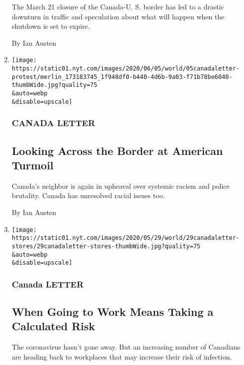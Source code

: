 \begin{enumerate}
  The March 21 closure of the Canada-U. S. border has led to a drastic
  downturn in traffic and speculation about what will happen when the
  shutdown is set to expire.

  By Ian Austen
\item
  \href{/2020/06/05/world/canada/racism-canada.html}{}

  \texttt{[image: https://static01.nyt.com/images/2020/06/05/world/05canadaletter-protest/merlin\_173183745\_1f948df0-b440-4d6b-9a03-f71b78be6040-thumbWide.jpg?quality=75\\\&auto=webp\\\&disable=upscale]}

  \hypertarget{canada-letter-6}{%
  \subsubsection{CANADA LETTER}\label{canada-letter-6}}

  \hypertarget{looking-across-the-border-at-american-turmoil}{%
  \subsection{Looking Across the Border at American
  Turmoil}\label{looking-across-the-border-at-american-turmoil}}

  Canada's neighbor is again in upheaval over systemic racism and police
  brutality. Canada has unresolved racial issues too.

  By Ian Austen
\item
  \href{/2020/05/29/world/canada/essential-workers.html}{}

  \texttt{[image: https://static01.nyt.com/images/2020/05/29/world/29canadaletter-stores/29canadaletter-stores-thumbWide.jpg?quality=75\\\&auto=webp\\\&disable=upscale]}

  \hypertarget{canada-letter-7}{%
  \subsubsection{Canada LETTER}\label{canada-letter-7}}

  \hypertarget{when-going-to-work-means-taking-a-calculated-risk}{%
  \subsection{When Going to Work Means Taking a Calculated
  Risk}\label{when-going-to-work-means-taking-a-calculated-risk}}

  The coronavirus hasn't gone away. But an increasing number of
  Canadians are heading back to workplaces that may increase their risk
  of infection.


\end{enumerate}
